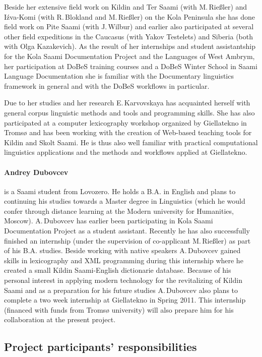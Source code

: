 \documentclass[a4paper,12pt]{article}
\begin{document}
{{{{Beside her extensive field work on Kildin and Ter Saami (with M.\,Rießler) and Iźva-Komi (with R.\,Blokland and M.\,Rießler) on the Kola Peninsula she has done field work on Pite Saami (with J.\,Wilbur) and earlier also participated at several other field expeditions in the Caucasus (with Yakov Testelets) and Siberia (both with Olga Kazakevich). As the result of her internships and student assistantship for the Kola Saami Documentation Project and the Languages of West Ambrym, her participation at DoBeS training courses and a DoBeS Winter School in Saami Language Documentation she is familiar with the Documentary linguistics framework in general and with the DoBeS workflows in particular.

Due to her studies and her research E.\,Karvovskaya has acquainted herself with general corpus linguistic methods and tools and programming skills. She has also participated at a computer lexicography workshop organized by Giellatekno in Tromsø and has been working with the creation of Web-based teaching tools for Kildin and Skolt Saami. He is thus also well familiar with practical computational linguistics applications and the methods and workflows applied at Giellatekno.

\paragraph{Andrey Dubovcev} is a Saami student from Lovozero. He holds a B.A. in English and plans to continuing his studies towards a Master degree in Linguistics (which he would confer through distance learning at the Modern university for Humanities, Moscow). A.\,Dubovcev has earlier been participating in Kola Saami Documentation Project as a student assistant. Recently he has also successfully finished an internship (under the supervision of co-applicant M.\,Rießler) as part of his B.A. studies. Beside working with native speakers A.\,Dubovcev gained skills in lexicography and XML programming during this internship where he created a small Kildin Saami-English dictionarie database. Because of his personal interest in applying modern technology for the revitalizing of Kildin Saami and as a preparation for his future studies A.\,Dubovcev also plans to complete a two week internship at Giellatekno in Spring 2011. This internship (financed with funds from Tromsø university) will also prepare him for his collaboration at the present  project.

\subsection{Project participants' responsibilities}

}}}}
\end{document}
